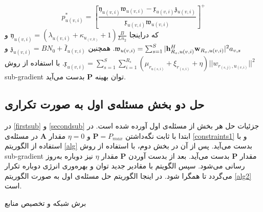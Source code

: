 \begin{equation}
	p_{u(v,i)}^{*} = [\frac{\mathfrak{y}_{u(v,i)}\mathfrak{w}_{u(v,i)}-\mathfrak{x}_{u(v,i)}\mathfrak{z}_{u(v,i)}}{\mathfrak{x}_{u(v,i)}\mathfrak{w}_{u(v,i)} }]^+
\end{equation}
که دراینجا 
 $\mathfrak{y}_{u(v,i)}= (\lambda_{u(v,i)}+\kappa_{u_{(v,k)}}+1)\frac{B}{Ln_2}$
 و
$\mathfrak{w}_{u(v,i)} = \sum_{s=1}^{S}|\bold{h}_{R_s,u(v,i)}^H \bold{w}_{R_s,u(v,i)}|^2 a_{v,s}$. 
همچنین
$\mathfrak{z}_{u(v,i)} = BN_0 + \bar{I}_{u(v,i)}$ و $\mathfrak{x}_{u(v,i)} = \sum\limits_{s=1}^{S} \sum\limits_{i=1}^{R_s} ( \mu_{r_{u(s,i)}} + \xi_{r_{(s,i)}}+\eta)||w_{r_{(s,j)},u_{(v,i)}}||^2$.
با استفاده از روش sub-gradient توان بهینه $\boldsymbol{P}$ بدست می‌آید\cite{mimoCran}.
\subsection{حل دو بخش مسئله‌ی اول به صورت تکراری}
در \eqref{firstsub} و \eqref{secondsub}
جزئیات حل هر بخش از مسئله‌ی اول آورده شده است.
در ابتدا با ثابت نگه‌داشتن $\boldsymbol{P} = P_{max}$
و $\eta = 0$
مقدار $\boldsymbol{A}$
در مسئله‌ی \eqref{constraints1}
و با استفاده از الگوریتم \eqref{alg}
بدست می‌آید. 
پس از آن در بخش دوم، با استفاده از روش 
sub-gradient
مقدار
 $\boldsymbol{P}$ 
بدست می‌آید. 
بعد از بدست آوردن $\boldsymbol{P}$
مقدار $\eta$
نیز دوباره به‌روز رسانی می‌شود.
 سپس الگویتم با مقادیر جدید توان و بهره‌وری انرژی دوباره تکرار می‌گردد تا همگرا شود.
در اینجا الگوریتم حل مسئله‌ی اول به صورت الگوریتم \eqref{alg2} است.

\begin{algorithm}
	\caption{برش شبکه و تخصیص منابع}\label{alg2}
	\begin{latin}
	\begin{algorithmic}[1]
		\Else
		\EndIf
		\EndFor
	\end{algorithmic}
	\end{latin}
\end{algorithm}
